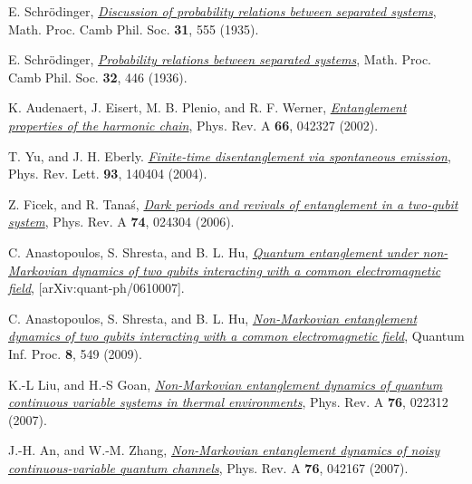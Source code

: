 \documentclass[11pt,a4paper]{article}
\begin{document}
\begin{thebibliography}{99}

    E. Schr\"odinger, \href{https://doi.org/10.1017/S0305004100013554}{\textit{Discussion of probability relations between separated systems}}, Math. Proc. Camb Phil. Soc. \textbf{31}, 555 (1935).

    E. Schr\"odinger, \href{https://doi.org/10.1017/S0305004100019137}{\textit{Probability relations between separated systems}}, Math. Proc. Camb Phil. Soc. \textbf{32}, 446 (1936).

    K. Audenaert, J. Eisert, M. B. Plenio, and R. F. Werner, \href{https://doi.org/10.1103/PhysRevA.66.042327}{\textit{Entanglement properties of the harmonic chain}}, Phys. Rev. A \textbf{66}, 042327 (2002).

    T. Yu, and J. H. Eberly. \href{https://doi.org/10.1103/PhysRevLett.93.140404}{\textit{Finite-time disentanglement via spontaneous emission}}, Phys. Rev. Lett. \textbf{93}, 140404 (2004).

    Z. Ficek, and R. Tana\'s, \href{https://doi.org/10.1103/PhysRevA.74.024304}{\textit{Dark periods and revivals of entanglement in a two-qubit system}}, Phys. Rev. A \textbf{74}, 024304 (2006).

    C. Anastopoulos,  S. Shresta, and B. L. Hu, \href{https://doi.org/10.48550/arXiv.quant-ph/0610007}{\textit{Quantum entanglement under non-Markovian dynamics of two qubits interacting with a common electromagnetic field}}, [arXiv:quant-ph/0610007].

    C. Anastopoulos, S. Shresta, and B. L. Hu, \href{https://doi.org/10.1007/s11128-009-0137-6}{\textit{Non-Markovian entanglement dynamics of two qubits interacting with a common electromagnetic field}}, Quantum Inf. Proc. \textbf{8}, 549 (2009).%

    K.-L Liu, and H.-S Goan, \href{https://doi.org/10.1103/PhysRevA.76.022312}{\textit{Non-Markovian entanglement dynamics of quantum continuous variable systems in thermal environments}}, Phys. Rev. A \textbf{76}, 022312 (2007).

    J.-H. An, and W.-M. Zhang, \href{https://doi.org/10.1103/PhysRevA.76.042127}{\textit{Non-Markovian entanglement dynamics of noisy continuous-variable quantum channels}}, Phys. Rev. A \textbf{76}, 042167 (2007).


\end{thebibliography}
\end{document}
